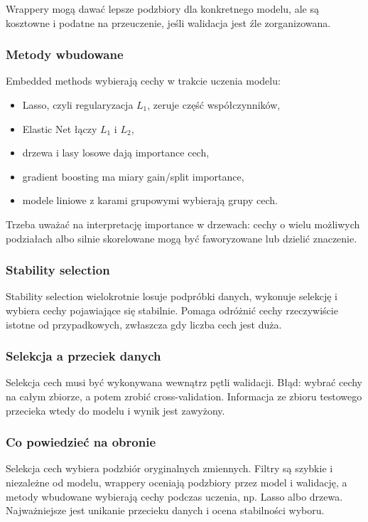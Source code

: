 Wrappery mogą dawać lepsze podzbiory dla konkretnego modelu, ale są kosztowne i podatne na przeuczenie, jeśli walidacja jest źle zorganizowana.

\subsubsection{Metody wbudowane}

Embedded methods wybierają cechy w trakcie uczenia modelu:
\begin{itemize}
  \item Lasso, czyli regularyzacja $L_1$, zeruje część współczynników,
  \item Elastic Net łączy $L_1$ i $L_2$,
  \item drzewa i lasy losowe dają importance cech,
  \item gradient boosting ma miary gain/split importance,
  \item modele liniowe z karami grupowymi wybierają grupy cech.
\end{itemize}

Trzeba uważać na interpretację importance w drzewach: cechy o wielu możliwych podziałach albo silnie skorelowane mogą być faworyzowane lub dzielić znaczenie.

\subsubsection{Stability selection}

Stability selection wielokrotnie losuje podpróbki danych, wykonuje selekcję i wybiera cechy pojawiające się stabilnie. Pomaga odróżnić cechy rzeczywiście istotne od przypadkowych, zwłaszcza gdy liczba cech jest duża.

\subsubsection{Selekcja a przeciek danych}

Selekcja cech musi być wykonywana wewnątrz pętli walidacji. Błąd: wybrać cechy na całym zbiorze, a potem zrobić cross-validation. Informacja ze zbioru testowego przecieka wtedy do modelu i wynik jest zawyżony.

\subsubsection{Co powiedzieć na obronie}

Selekcja cech wybiera podzbiór oryginalnych zmiennych. Filtry są szybkie i niezależne od modelu, wrappery oceniają podzbiory przez model i walidację, a metody wbudowane wybierają cechy podczas uczenia, np. Lasso albo drzewa. Najważniejsze jest unikanie przecieku danych i ocena stabilności wyboru.


